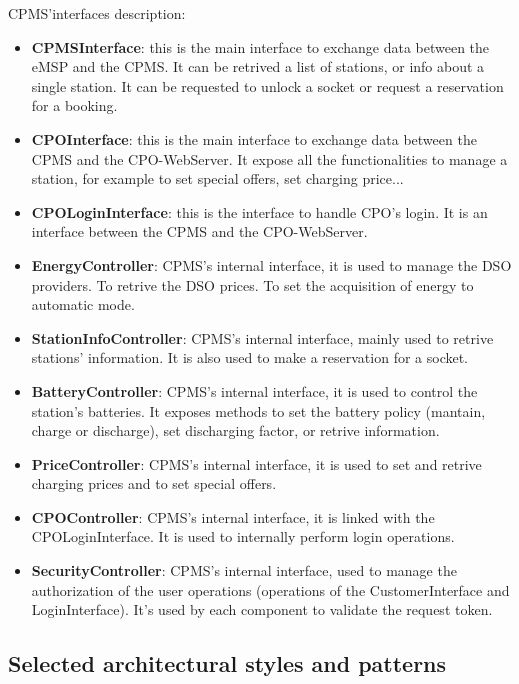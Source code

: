 CPMS'interfaces description:
\begin{itemize}
    \item \textbf{CPMSInterface}: this is the main interface to exchange data between the eMSP and the CPMS. It can be retrived a list of stations, or info about a single station. It can be requested to unlock a socket or request a reservation for a booking.
    \item \textbf{CPOInterface}: this is the main interface to exchange data between the CPMS and the CPO-WebServer. It expose all the functionalities to manage a station, for example to set special offers, set charging price...
    \item \textbf{CPOLoginInterface}: this is the interface to handle CPO's login. It is an interface between the CPMS and the CPO-WebServer.
    \item \textbf{EnergyController}: CPMS's internal interface, it is used to manage the DSO providers. To retrive the DSO prices. To set the acquisition of energy to automatic mode.
    \item \textbf{StationInfoController}: CPMS's internal interface, mainly used to retrive stations' information. It is also used to make a reservation for a socket.
    \item \textbf{BatteryController}: CPMS's internal interface, it is used to control the station's batteries. It exposes methods to set the battery policy (mantain, charge or discharge), set discharging factor, or retrive information.
    \item \textbf{PriceController}: CPMS's internal interface, it is used to set and retrive charging prices and to set special offers.
    \item \textbf{CPOController}: CPMS's internal interface, it is linked with the CPOLoginInterface. It is used to internally perform login operations.
    \item \textbf{SecurityController}: CPMS's internal interface, used to manage the authorization of the user operations (operations of the CustomerInterface and LoginInterface). It's used by each component to validate the request token.
    
\end{itemize}

\subsection{Selected architectural styles and patterns}

